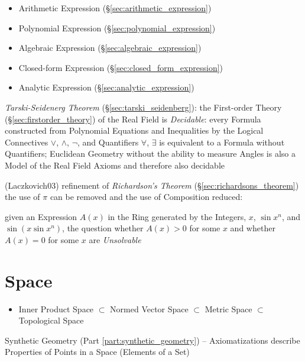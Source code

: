 \begin{itemize}
  \item Arithmetic Expression (\S\ref{sec:arithmetic_expression})
  \item Polynomial Expression (\S\ref{sec:polynomial_expression})
  \item Algebraic Expression (\S\ref{sec:algebraic_expression})
  \item Closed-form Expression (\S\ref{sec:closed_form_expression})
  \item Analytic Expression (\S\ref{sec:analytic_expression})
\end{itemize}

\emph{Tarski-Seidenerg Theorem} (\S\ref{sec:tarski_seidenberg}): the First-order
Theory (\S\ref{sec:firstorder_theory}) of the Real Field is \emph{Decidable}:
every Formula constructed from Polynomial Equations and Inequalities by the
Logical Connectives $\vee$, $\wedge$, $\neg$, and Quantifiers $\forall$,
$\exists$ is equivalent to a Formula without Quantifiers; Euclidean Geometry
without the ability to measure Angles is also a Model of the Real Field Axioms
and therefore also decidable

(Laczkovich03) refinement of \emph{Richardson's Theorem}
(\S\ref{sec:richardsons_theorem}) the use of $\pi$ can be removed and the use
of Composition reduced:

given an Expression $A(x)$ in the Ring generated by the Integers, $x$, $\sin
x^n$, and $\sin(x \sin x^n)$, the question whether $A(x) > 0$ for some $x$ and
whether $A(x) = 0$ for some $x$ are \emph{Unsolvable}



\section{Space}\label{sec:space}

\begin{itemize}
  \item Inner Product Space \newline
    $\subset$ Normed Vector Space \newline
    $\subset$ Metric Space \newline
    $\subset$ Topological Space
\end{itemize}

Synthetic Geometry (Part \ref{part:synthetic_geometry}) -- Axiomatizations
describe Properties of Points in a Space (Elements of a Set)

